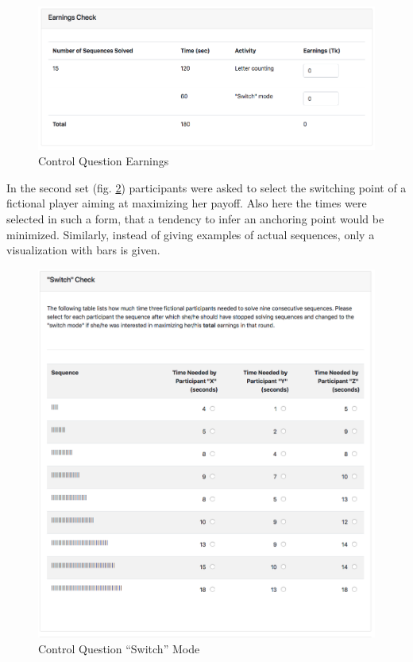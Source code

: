     \begin{figure}
        \centering
        \includegraphics[width=\textwidth]{graphs/cq_earnings.png}
        \caption{Control Question Earnings}
        \label{fig:cq_earnings}
    \end{figure}
    
    In the second set (fig. \ref{fig:cq_switch}) participants were asked to select the switching point of a fictional player aiming at maximizing her payoff. Also here the times were selected in such a form, that a tendency to infer an anchoring point would be minimized. Similarly, instead of giving examples of actual sequences, only a visualization with bars is given.
    
    \begin{figure}
        \centering
        \includegraphics[width=\textwidth]{graphs/cq_switch.png}
        \caption{Control Question ``Switch'' Mode}
        \label{fig:cq_switch}
    \end{figure}
    
